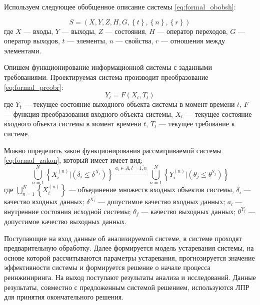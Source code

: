 Используем следующее обобщенное описание системы \ref{eq:formal_obobsh}: 

\begin{equation}
    \label{eq:formal_obobsh}
    S=(X,Y,Z,H,G, \left\{ t \right\}, \left\{ n \right\}, \left\{ r \right\} )
\end{equation}
\vspace{\baselineskip}
где $X$ --- входы,
$Y$ --- выходы,
$Z$ --- состояния,
$H$ --- оператор переходов,
$G$ --- оператор выходов,
$t$ --- элементы,
$n$ --- свойства,
$r$ --- отношения между элементами.

Опишем функционирование информационной системы с заданными требованиями. 
Проектируемая система производит преобразование \ref{eq:formal_preobr}:
\begin{equation}
    \label{eq:formal_preobr}
    Y_t=F(X_t,T_t)
\end{equation} 
\vspace{\baselineskip}
где $Y_t$ --- текущее состояние выходного объекта системы в момент времени $t$,
$F$ --- функция преобразования входного объекта системы,
$X_t$ --- текущее состояние входного объекта системы в момент времени $t$,
$T_t$ --- текущее требование к системе.

Можно определить закон функционирования рассматриваемой системы \ref{eq:formal_zakon}, который имеет имеет вид: 
\begin{equation}
    \label{eq:formal_preobr}
    \bigcup_{n=1}^N \left\{ X_i^{(n)} | (\delta_i \leq \delta^{X_i}) \right\}
    \xrightarrow{a_i \in A, l=\overline{1,n}}
    \bigcup_{n=1}^N \left\{ Y_i^{(n)} | (\theta_j \leq \theta^{Y_j}) \right\}
\end{equation} 
\vspace{\baselineskip}
где $\bigcup_{n=1}^N \left\{ X_i^{(n)} \right\}$ --- объединение множеств входных объектов системы,
$\delta_i$ --- качество входных данных;
$\delta^{X_i}$ --- допустимое качество входных данных; 
$a_l$ --- внутренние состояния исходной системы; 
$\theta_j$ --- качество выходных данных;
$\theta^{Y_j}$ --- допустимое качество выходных данных. 

Поступающие на вход данные об анализируемой системе, в системе проходят предварительную обработку. 
Далее формируется модель устаревания системы, на основе которой рассчитываются параметры устаревания, прогнозируется значение эффективности системы и формируется решение о начале процесса реинжиниринга. 
На выход поступают результаты анализа и исследований. 
Данные результаты, совместно с предложенным системой решением, используются ЛПР для принятия окончательного решения.


